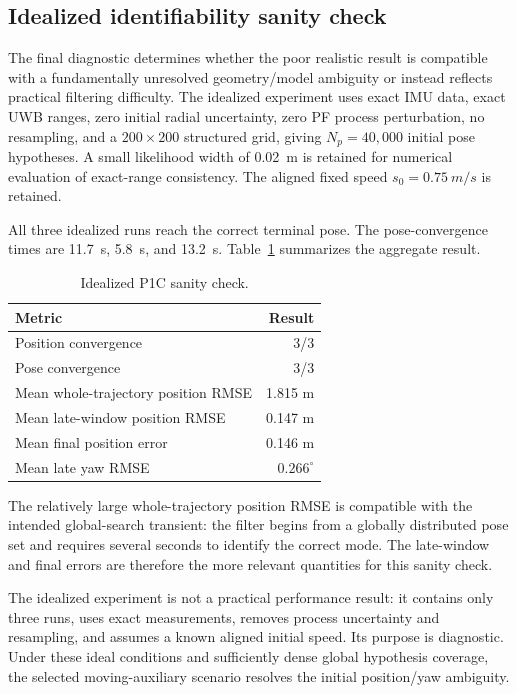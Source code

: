 \subsection{Idealized identifiability sanity check}
The final diagnostic determines whether the poor realistic result is compatible with a fundamentally unresolved geometry/model ambiguity or instead reflects practical filtering difficulty. The idealized experiment uses exact IMU data, exact UWB ranges, zero initial radial uncertainty, zero PF process perturbation, no resampling, and a $200\times200$ structured grid, giving $N_p=40{,}000$ initial pose hypotheses. A small likelihood width of \SI{0.02}{m} is retained for numerical evaluation of exact-range consistency. The aligned fixed speed $s_0=\SI{0.75}{m/s}$ is retained.

All three idealized runs reach the correct terminal pose. The pose-convergence times are \SI{11.7}{s}, \SI{5.8}{s}, and \SI{13.2}{s}. Table~\ref{tab:p1c_ideal} summarizes the aggregate result.
\begin{table}[ht]
\centering
\caption{Idealized P1C sanity check.}
\label{tab:p1c_ideal}
\begin{tabular}{lr}
\toprule
Metric & Result\\
\midrule
Position convergence & 3/3\\
Pose convergence & 3/3\\
Mean whole-trajectory position RMSE & 1.815 m\\
Mean late-window position RMSE & 0.147 m\\
Mean final position error & 0.146 m\\
Mean late yaw RMSE & $0.266^{\circ}$\\
\bottomrule
\end{tabular}
\end{table}
The relatively large whole-trajectory position RMSE is compatible with the intended global-search transient: the filter begins from a globally distributed pose set and requires several seconds to identify the correct mode. The late-window and final errors are therefore the more relevant quantities for this sanity check.

The idealized experiment is not a practical performance result: it contains only three runs, uses exact measurements, removes process uncertainty and resampling, and assumes a known aligned initial speed. Its purpose is diagnostic. Under these ideal conditions and sufficiently dense global hypothesis coverage, the selected moving-auxiliary scenario resolves the initial position/yaw ambiguity.

